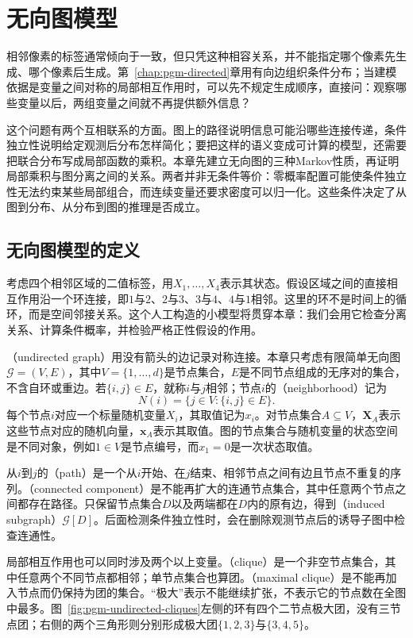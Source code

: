 \chapter{无向图模型}
\label{chap:pgm-undirected}

相邻像素的标签通常倾向于一致，但只凭这种相容关系，并不能指定哪个像素先生成、哪个像素后生成。第~\ref{chap:pgm-directed}章用有向边组织条件分布；当建模依据是变量之间对称的局部相互作用时，可以先不规定生成顺序，直接问：观察哪些变量以后，两组变量之间就不再提供额外信息？

这个问题有两个互相联系的方面。图上的路径说明信息可能沿哪些连接传递，条件独立性说明给定观测后分布怎样简化；要把这样的语义变成可计算的模型，还需要把联合分布写成局部函数的乘积。本章先建立无向图的三种Markov性质，再证明局部乘积与图分离之间的关系。两者并非无条件等价：零概率配置可能使条件独立性无法约束某些局部组合，而连续变量还要求密度可以归一化。这些条件决定了从图到分布、从分布到图的推理是否成立。

\section{无向图模型的定义}
\label{sec:pgm-undirected-definition}

考虑四个相邻区域的二值标签，用$X_1,\ldots,X_4$表示其状态。假设区域之间的直接相互作用沿一个环连接，即$1$与$2$、$2$与$3$、$3$与$4$、$4$与$1$相邻。这里的环不是时间上的循环，而是空间邻接关系。这个人工构造的小模型将贯穿本章：我们会用它检查分离关系、计算条件概率，并检验严格正性假设的作用。

（undirected graph）用没有箭头的边记录对称连接。本章只考虑有限简单无向图$\mathcal{G}=(V,E)$，其中$V=\{1,\ldots,d\}$是节点集合，$E$是不同节点组成的无序对的集合，不含自环或重边。若$\{i,j\}\in E$，就称$i$与$j$相邻；节点$i$的（neighborhood）记为
\[
  N(i)=\{j\in V:\{i,j\}\in E\}.
\]
每个节点$i$对应一个标量随机变量$X_i$，其取值记为$x_i$。对节点集合$A\subseteq V$，$\bm{X}_A$表示这些节点对应的随机向量，$\bm{x}_A$表示其取值。图的节点集合与随机变量的状态空间是不同对象，例如$1\in V$是节点编号，而$x_1=0$是一次状态取值。

从$i$到$j$的（path）是一个从$i$开始、在$j$结束、相邻节点之间有边且节点不重复的序列。（connected component）是不能再扩大的连通节点集合，其中任意两个节点之间都存在路径。只保留节点集合$D$以及两端都在$D$内的原有边，得到（induced subgraph）$\mathcal{G}[D]$。后面检测条件独立性时，会在删除观测节点后的诱导子图中检查连通性。

局部相互作用也可以同时涉及两个以上变量。（clique）是一个非空节点集合，其中任意两个不同节点都相邻；单节点集合也算团。（maximal clique）是不能再加入节点而仍保持为团的集合。“极大”表示不能继续扩张，不表示它的节点数在全图中最多。图~\ref{fig:pgm-undirected-cliques}左侧的环有四个二节点极大团，没有三节点团；右侧的两个三角形则分别形成极大团$\{1,2,3\}$与$\{3,4,5\}$。

